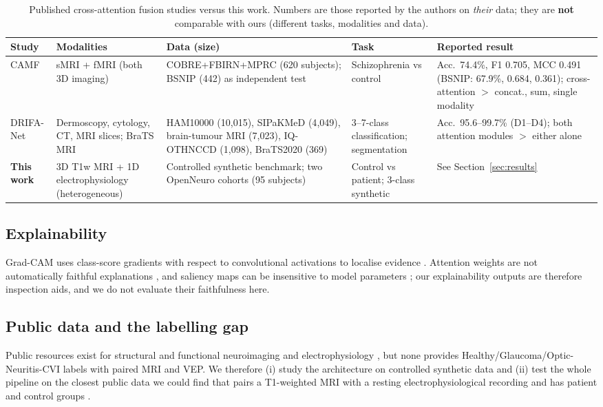 \documentclass{ieeeaccessapprox}
\begin{document}
\begin{table}[!t]
\caption{Published cross-attention fusion studies versus this work. Numbers are those reported by the authors on \emph{their} data; they are \textbf{not} comparable with ours (different tasks, modalities and data).}
\label{tab:lit}
\centering\footnotesize
\begin{tabular}{@{}p{}p{}p{}p{}p{}@{}}
\toprule
Study & Modalities & Data (size) & Task & Reported result\\
\midrule
CAMF \cite{zhou2024camf} & sMRI + fMRI (both 3D imaging) & COBRE+FBIRN+MPRC (620 subjects); BSNIP (442) as independent test & Schizophrenia vs control & Acc.\ 74.4\%, F1 0.705, MCC 0.491 (BSNIP: 67.9\%, 0.684, 0.361); cross-attention $>$ concat., sum, single modality\\
DRIFA-Net \cite{dhar2025drifa} & Dermoscopy, cytology, CT, MRI slices; BraTS MRI & HAM10000 (10{,}015), SIPaKMeD (4{,}049), brain-tumour MRI (7{,}023), IQ-OTHNCCD (1{,}098), BraTS2020 (369) & 3--7-class classification; segmentation & Acc.\ 95.6--99.7\% (D1--D4); both attention modules $>$ either alone\\
\textbf{This work} & 3D T1w MRI + 1D electrophysiology (heterogeneous) & Controlled synthetic benchmark; two OpenNeuro cohorts (95 subjects) & Control vs patient; 3-class synthetic & See Section~\ref{sec:results}\\
\bottomrule
\end{tabular}
\end{table}

\subsection{Explainability}
Grad-CAM uses class-score gradients with respect to convolutional activations to localise evidence \cite{selvaraju2017}. Attention weights are not automatically faithful explanations \cite{jain2019,wiegreffe2019}, and saliency maps can be insensitive to model parameters \cite{adebayo2018}; our explainability outputs are therefore inspection aids, and we do not evaluate their faithfulness here.

\subsection{Public data and the labelling gap}
Public resources exist for structural and functional neuroimaging and electrophysiology \cite{vanessen2013,benson2018,lamontagne2019,gramfort2013,goldberger2000}, but none provides Healthy/Glaucoma/Optic-Neuritis-CVI labels with paired MRI and VEP. We therefore (i) study the architecture on controlled synthetic data and (ii) test the whole pipeline on the closest public data we could find that pairs a T1-weighted MRI with a resting electrophysiological recording and has patient and control groups \cite{liuzzi2022ds003568,ds007181}.
\end{document}
